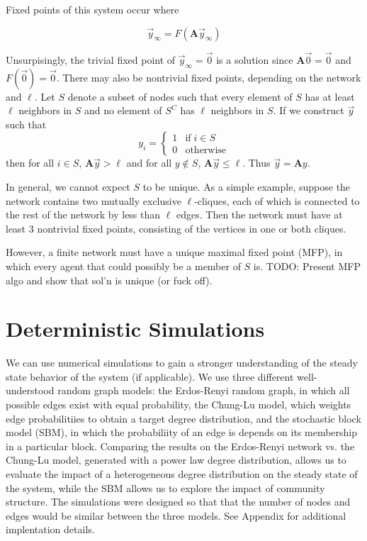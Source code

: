 \documentclass[12pt]{article}
\begin{document}
Fixed points of this system occur where

\begin{equation}
  \vec{y}_{\infty} = F(\mathbf{A}\vec{y}_{\infty})
\end{equation}

Unsurpisingly, the trivial fixed point of $\vec{y}_{\infty} = \vec{0}$ is a solution since $\mathbf{A}\vec{0} = \vec{0}$ and $F(\vec{0}) = \vec{0}$.  There may also be nontrivial fixed points, depending on the network and $\ell$.  Let $S$ denote a subset of nodes such that every element of $S$ has at least $\ell$ neighbors in $S$ and no element of $S^C$ has $\ell$ neighbors in $S$.  If we construct $\vec{y}$ such that  
\begin{equation}
  y_i = \begin{cases}
    1 &\text{if} \; i \in S \\
    0 &\text{otherwise}
  \end{cases}
\end{equation}
 then for all $i \in S$, $\mathbf{A}\vec{y} > \ell$ and for all $y \notin S$, $\mathbf{A}\vec{y} \leq \ell$.  Thus $\vec{y} = \mathbf{A}y$. 

In general, we cannot expect $S$ to be unique.  As a simple example, suppose the network contains two mutually exclusive $\ell$-cliques, each of which is connected to the rest of the network by less than $\ell$ edges.  Then the network must have at least 3 nontrivial fixed points, consisting of the vertices in one or both cliques.

However, a finite network must have a unique maximal fixed point (MFP), in which every agent that could possibly be a member of $S$ is.  
TODO: Present MFP algo and show that sol'n is unique (or fuck off). 

\section{Deterministic Simulations}
We can use numerical simulations to gain a stronger understanding of the steady state behavior of the system (if applicable).  We use three different well-understood random graph models: the Erdos-Renyi random graph, in which all possible edges exist with equal probability, the Chung-Lu model, which weights edge probabilitiies to obtain a target degree distribution, and the stochastic block model (SBM), in which the probabiliity of an edge is depends on its membership in a particular block.  Comparing the results on the Erdos-Renyi network vs. the Chung-Lu model, generated with a power law degree distribution, allows us to evaluate the impact of a heterogeneous degree distribution on the steady state of the system, while the SBM allows us to explore the impact of community structure.  The simulations were designed so that that the number of nodes and edges would be similar between the three models.  See Appendix for additional implentation details.
\end{document}
